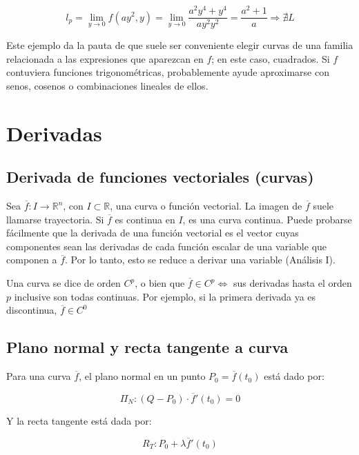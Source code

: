 \documentclass{article}
\renewcommand{\Bbb}{\mathbb}
\begin{document}
\begin{equation}
l_p = \lim_{y \rightarrow 0} f(ay^2, y) = \lim_{y \rightarrow 0} \frac{a^2 y^4 + y^4}{ay^2y^2} = \frac{a^2 + 1}{a} \Rightarrow \nexists L
\end{equation}

Este ejemplo da la pauta de que suele ser conveniente elegir curvas de una familia relacionada a las expresiones que aparezcan en $f$; en este caso, cuadrados. Si $f$ contuviera funciones trigonométricas, probablemente ayude aproximarse con senos, cosenos o combinaciones lineales de ellos.

\section{Derivadas}

\subsection{Derivada de funciones vectoriales (curvas)}

Sea $\overline{f}:I \rightarrow \Bbb R^n$, con $I \subset \Bbb R$, una curva o función vectorial. La imagen de $\overline{f}$ suele llamarse trayectoria. Si $\overline{f}$ es continua en $I$, es una curva continua. Puede probarse fácilmente que la derivada de una función vectorial es el vector cuyas componentes sean las derivadas de cada función escalar de una variable que componen a $\overline{f}$. Por lo tanto, esto se reduce a derivar una variable (Análisis I).

Una curva se dice de orden $C^p$, o bien que $\overline{f} \in C^p \Longleftrightarrow$ sus derivadas hasta el orden $p$ inclusive son todas continuas. Por ejemplo, si la primera derivada ya es discontinua, $\overline{f} \in C^0$

\subsection{Plano normal y recta tangente a curva}

Para una curva $\overline{f}$, el plano normal en un punto $P_0 = \overline{f}(t_0)$ está dado por:

\begin{equation}
\Pi_N : (Q - P_0) \cdot \overline{f}'(t_0) = 0
\end{equation}

Y la recta tangente está dada por:

\begin{equation}
R_T: P_0 + \lambda \overline{f}'(t_0)
\end{equation}
\end{document}
